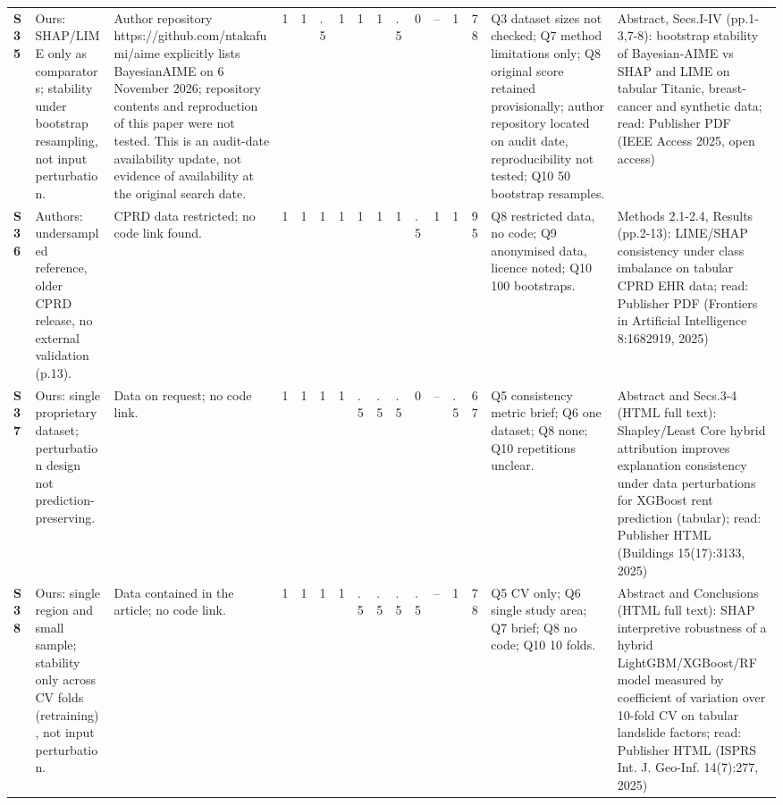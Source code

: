 \begin{longtable}{@{}P{1.0cm}P{4.6cm}P{3.6cm}P{0.3cm}P{0.3cm}P{0.3cm}P{0.3cm}P{0.3cm}P{0.3cm}P{0.3cm}P{0.3cm}P{0.3cm}P{0.36cm}P{0.75cm}P{3.0cm}P{3.9cm}@{}}
\textbf{S35} & Ours: SHAP/\allowbreak{}LIME only as comparators; stability under bootstrap resampling, not input perturbation. & Author repository https:/\allowbreak{}/\allowbreak{}github.com/\allowbreak{}ntakafumi/\allowbreak{}aime explicitly lists BayesianAIME on 6 November 2026; repository contents and reproduction of this paper were not tested. This is an audit-date availability update, not evidence of availability at the original search date. & 1 & 1 & .5 & 1 & 1 & 1 & .5 & 0 & -- & 1 & 78 & Q3 dataset sizes not checked; Q7 method limitations only; Q8 original score retained provisionally; author repository located on audit date, reproducibility not tested; Q10 50 bootstrap resamples. & Abstract, Secs.I-IV (pp.1-3,7-8): bootstrap stability of Bayesian-AIME vs SHAP and LIME on tabular Titanic, breast-cancer and synthetic data; read: Publisher PDF (IEEE Access 2025, open access) \\
\textbf{S36} & Authors: undersampled reference, older CPRD release, no external validation (p.13). & CPRD data restricted; no code link found. & 1 & 1 & 1 & 1 & 1 & 1 & 1 & .5 & 1 & 1 & 95 & Q8 restricted data, no code; Q9 anonymised data, licence noted; Q10 100 bootstraps. & Methods 2.1-2.4, Results (pp.2-13): LIME/\allowbreak{}SHAP consistency under class imbalance on tabular CPRD EHR data; read: Publisher PDF (Frontiers in Artificial Intelligence 8:1682919, 2025) \\
\textbf{S37} & Ours: single proprietary dataset; perturbation design not prediction-preserving. & Data on request; no code link. & 1 & 1 & 1 & 1 & .5 & .5 & .5 & 0 & -- & .5 & 67 & Q5 consistency metric brief; Q6 one dataset; Q8 none; Q10 repetitions unclear. & Abstract and Secs.3-4 (HTML full text): Shapley/\allowbreak{}Least Core hybrid attribution improves explanation consistency under data perturbations for XGBoost rent prediction (tabular); read: Publisher HTML (Buildings 15(17):3133, 2025) \\
\textbf{S38} & Ours: single region and small sample; stability only across CV folds (retraining), not input perturbation. & Data contained in the article; no code link. & 1 & 1 & 1 & 1 & .5 & .5 & .5 & .5 & -- & 1 & 78 & Q5 CV only; Q6 single study area; Q7 brief; Q8 no code; Q10 10 folds. & Abstract and Conclusions (HTML full text): SHAP interpretive robustness of a hybrid LightGBM/\allowbreak{}XGBoost/\allowbreak{}RF model measured by coefficient of variation over 10-fold CV on tabular landslide factors; read: Publisher HTML (ISPRS Int. J. Geo-Inf. 14(7):277, 2025) \\

\end{longtable}
